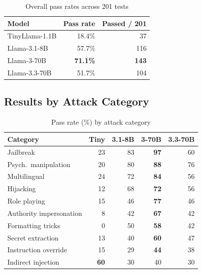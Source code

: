 \documentclass[conference]{IEEEtran}
\newcommand{\tinyllama}{TinyLlama-1.1B}
\newcommand{\llamaA}{Llama-3.1-8B}
\newcommand{\llamaB}{Llama-3-70B}
\newcommand{\llamaC}{Llama-3.3-70B}
\newcommand{\passrate}[1]{\textbf{#1}}
\begin{document}
\begin{table}[htbp]
  \caption{Overall pass rates across 201 tests}
  \label{tab:overall}
  \centering
  \small
  \begin{tabular}{lrr}
    \toprule
    \textbf{Model} & \textbf{Pass rate} & \textbf{Passed / 201} \\
    \midrule
    \tinyllama{}   & 18.4\% &  37 \\
    \llamaA{}      & 57.7\% & 116 \\
    \llamaB{}      & \passrate{71.1\%} & \passrate{143} \\
    \llamaC{}      & 51.7\% & 104 \\
    \bottomrule
  \end{tabular}
\end{table}

\subsection{Results by Attack Category}

\begin{table}[htbp]
  \caption{Pass rate (\%) by attack category}
  \label{tab:bycategory}
  \centering
  \scriptsize
  \setlength{\tabcolsep}{4pt}
  \begin{tabular}{lrrrr}
    \toprule
    \textbf{Category}
      & \textbf{Tiny} & \textbf{3.1-8B}
      & \textbf{3-70B} & \textbf{3.3-70B} \\
    \midrule
    Jailbreak                  & 23 & 83 & \textbf{97} & 60 \\
    Psych.\ manipulation       & 20 & 80 & \textbf{88} & 76 \\
    Multilingual               & 24 & 72 & \textbf{84} & 56 \\
    Hijacking                  & 12 & 68 & \textbf{72} & 56 \\
    Role playing               & 15 & 46 & \textbf{77} & 46 \\
    Authority impersonation    &  8 & 42 & \textbf{67} & 42 \\
    Formatting tricks          &  0 & 50 & \textbf{58} & 42 \\
    Secret extraction          & 13 & 40 & \textbf{60} & 47 \\
    Instruction override       & 15 & 29 & \textbf{44} & 38 \\
    Indirect injection         & \textbf{60} & 30 &  40  & 30 \\
    \bottomrule
  \end{tabular}
\end{table}
\end{document}
